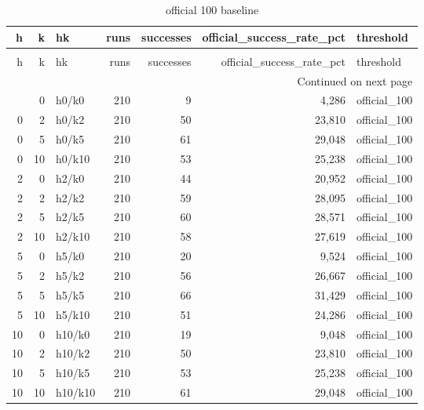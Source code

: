 \begin{longtable}{rrlrrrl}
\caption{official 100 baseline} \label{tab:official_100_baseline} \\
\toprule
h & k & hk & runs & successes & official\_success\_rate\_pct & threshold \\
\midrule
\endfirsthead
\caption[]{official 100 baseline} \\
\toprule
h & k & hk & runs & successes & official\_success\_rate\_pct & threshold \\
\midrule
\endhead
\midrule
\multicolumn{7}{r}{Continued on next page} \\
\midrule
\endfoot
\bottomrule
\endlastfoot
0 & 0 & h0/k0 & 210 & 9 & 4,286 & official\_100 \\
0 & 2 & h0/k2 & 210 & 50 & 23,810 & official\_100 \\
0 & 5 & h0/k5 & 210 & 61 & 29,048 & official\_100 \\
0 & 10 & h0/k10 & 210 & 53 & 25,238 & official\_100 \\
2 & 0 & h2/k0 & 210 & 44 & 20,952 & official\_100 \\
2 & 2 & h2/k2 & 210 & 59 & 28,095 & official\_100 \\
2 & 5 & h2/k5 & 210 & 60 & 28,571 & official\_100 \\
2 & 10 & h2/k10 & 210 & 58 & 27,619 & official\_100 \\
5 & 0 & h5/k0 & 210 & 20 & 9,524 & official\_100 \\
5 & 2 & h5/k2 & 210 & 56 & 26,667 & official\_100 \\
5 & 5 & h5/k5 & 210 & 66 & 31,429 & official\_100 \\
5 & 10 & h5/k10 & 210 & 51 & 24,286 & official\_100 \\
10 & 0 & h10/k0 & 210 & 19 & 9,048 & official\_100 \\
10 & 2 & h10/k2 & 210 & 50 & 23,810 & official\_100 \\
10 & 5 & h10/k5 & 210 & 53 & 25,238 & official\_100 \\
10 & 10 & h10/k10 & 210 & 61 & 29,048 & official\_100 \\
\end{longtable}
